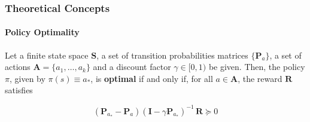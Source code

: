 \begin{frame}
	\frametitle{Theoretical Concepts}
	\framesubtitle{Policy Optimality}
	
	\Large
	
	Let a finite state space $ \mathbf{S} $, a set of transition probabilities matrices $ \{
	\mathbf{P}_{a} \} $, a set of actions $ \mathbf{A} = \{a_1,\ldots,a_k\} $ and a discount
	factor $ \gamma \in [0,1) $ be given. Then, the policy $ \pi $, given by $ \pi(s) \equiv a_*
	$, is \textbf{optimal} if and only if, for all $ a \in \mathbf{A} $, the reward $ \mathbf{R}
	$ satisfies
	
	\begin{equation*}
		(\mathbf{P}_{a_*} - \mathbf{P}_a)(\mathbf{I} - \gamma \mathbf{P}_{a_*})^{-1} \,
		\mathbf{R} \succeq 0
	\end{equation*}
\end{frame}
